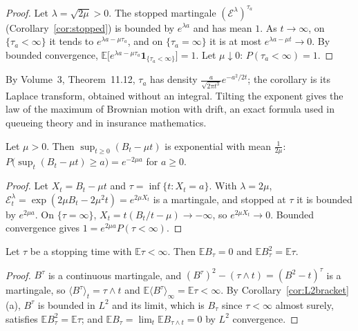 \begin{proof}
Let $\lambda=\sqrt{2\mu}>0$. The stopped martingale $(\mathcal E^\lambda)^{\tau_a}$ (Corollary~\ref{cor:stopped}) is bounded by $e^{\lambda a}$ and has mean $1$. As $t\to\infty$, on $\{\tau_a<\infty\}$ it tends to
$e^{\lambda a-\mu\tau_a}$, and on $\{\tau_a=\infty\}$ it is at most $e^{\lambda a-\mu t}\to0$. By bounded convergence, $\mathbb E\bigl[e^{\lambda a-\mu\tau_a}\mathbf 1_{\{\tau_a<\infty\}}\bigr]=1$. Let $\mu\downarrow0$:
$P(\tau_a<\infty)=1$.
\end{proof}

By Volume~3, Theorem~11.12, $\tau_a$ has density $\frac{a}{\sqrt{2\pi t^3}}e^{-a^2/2t}$; the corollary is its Laplace transform, obtained without an integral. Tilting the exponent gives the law of the
maximum of Brownian motion with drift, an exact formula used in queueing theory and in insurance mathematics.

\begin{corollary}\label{cor:driftmax}
Let $\mu>0$. Then $\sup_{t\ge0}(B_t-\mu t)$ is exponential with mean $\frac1{2\mu}$: $P\bigl(\sup_t(B_t-\mu t)\ge a\bigr)=e^{-2\mu a}$ for $a\ge0$.
\end{corollary}

\begin{proof}
Let $X_t=B_t-\mu t$ and $\tau=\inf\{t:X_t=a\}$. With $\lambda=2\mu$, $\mathcal E^{\lambda}_t=\exp(2\mu B_t-2\mu^2t)=e^{2\mu X_t}$ is a martingale, and stopped at $\tau$ it is bounded by $e^{2\mu a}$. On $\{\tau=\infty\}$,
$X_t=t(B_t/t-\mu)\to-\infty$, so $e^{2\mu X_t}\to0$. Bounded convergence gives $1=e^{2\mu a}P(\tau<\infty)$.
\end{proof}

\begin{proposition}\label{prop:wald}
Let $\tau$ be a stopping time with $\mathbb E\tau<\infty$. Then $\mathbb EB_\tau=0$ and $\mathbb EB_\tau^2=\mathbb E\tau$.
\end{proposition}

\begin{proof}
$B^\tau$ is a continuous martingale, and $(B^\tau)^2-(\tau\wedge t)=(B^2-t)^\tau$ is a martingale, so $\langle B^\tau\rangle_t=\tau\wedge t$ and $\mathbb E\langle B^\tau\rangle_\infty=\mathbb E\tau<\infty$. By
Corollary~\ref{cor:L2bracket}(a), $B^\tau$ is bounded in $L^2$ and its limit, which is $B_\tau$ since $\tau<\infty$ almost surely, satisfies $\mathbb EB_\tau^2=\mathbb E\tau$; and
$\mathbb EB_\tau=\lim_t\mathbb EB_{\tau\wedge t}=0$ by $L^2$ convergence.
\end{proof}

